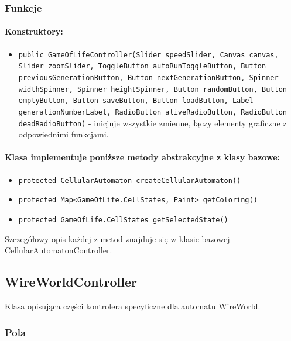 \documentclass{report}
\begin{document}
\subsubsection{Funkcje}
\paragraph{Konstruktory:}
\begin{itemize}
\item \texttt{public GameOfLifeController(Slider speedSlider, Canvas canvas, Slider zoomSlider, ToggleButton autoRunToggleButton, Button previousGenerationButton, Button nextGenerationButton, Spinner widthSpinner, Spinner heightSpinner, Button randomButton, Button emptyButton, Button saveButton, Button loadButton, Label generationNumberLabel, RadioButton aliveRadioButton, RadioButton deadRadioButton)} - inicjuje wszystkie zmienne, łączy elementy graficzne z odpowiednimi funkcjami.
\end{itemize}
\paragraph{Klasa implementuje poniższe metody abstrakcyjne z klasy bazowe:}
\begin{itemize}
	\item \texttt{protected CellularAutomaton createCellularAutomaton()}
	\item \texttt{protected Map<GameOfLife.CellStates, Paint> getColoring()} 
	\item \texttt{protected GameOfLife.CellStates getSelectedState()}
\end{itemize}
Szczegółowy opis każdej z metod znajduje się w klasie bazowej \hyperref[]{CellularAutomatonController}.


\subsection{WireWorldController}
Klasa opisująca części kontrolera specyficzne dla automatu WireWorld.
\subsubsection{Pola}
\end{document}
